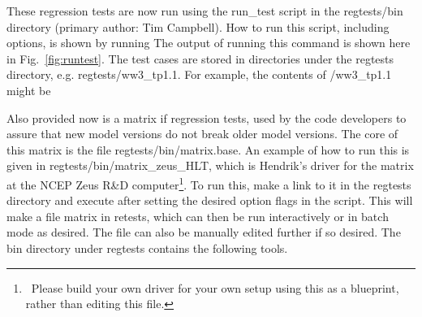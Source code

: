 \noindent
These regression tests are now run using the {\file run\_test} script in the
{\file regtests/bin} directory (primary author: Tim Campbell). How to run this
script, including options, is shown by running  The
output of running this command is shown here in Fig.~\ref{fig:runtest}.  The
test cases are stored in directories under the {\file regtests} directory,
e.g.  {\file regtests/ww3\_tp1.1}. For example, the contents of {\file
/ww3\_tp1.1} might be

\begin{flist}
\end{flist}

\noindent
Also provided now is a matrix if regression tests, used by the code developers
to assure that new model versions do not break older model versions. The core
of this matrix is the file {\file regtests/bin/matrix.base}. An example of how
to run this is given in {\file regtests/bin/matrix\_zeus\_HLT}, which is
Hendrik's driver for the matrix at the NCEP Zeus R\&D
computer\footnote{~Please build your own driver for your own setup using this
as a blueprint, rather than editing this file.}. To run this, make a link to
it in the {\file regtests} directory and execute after setting the desired
option flags in the script. This will make a file {\file matrix} in {\file
retests}, which can then be run interactively or in batch mode as desired. The
file can also be manually edited further if so desired. The {\file bin}
directory under {\file regtests} contains the following tools.

\begin{flist}
\end{flist}

